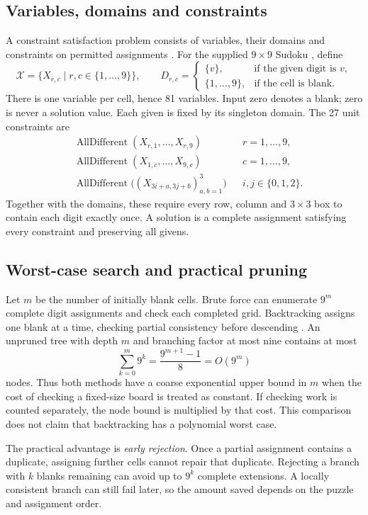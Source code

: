 \documentclass[11pt,a4paper]{article}
\begin{document}
\subsection{Variables, domains and constraints}
A constraint satisfaction problem consists of variables, their domains and constraints on permitted assignments \cite{csp}. For the supplied $9\times9$ Sudoku \cite{spec}, define
\[
\mathcal{X}=\{X_{r,c}\mid r,c\in\{1,\ldots,9\}\},\qquad
D_{r,c}=\begin{cases}\{v\},&\text{if the given digit is }v,\\
\{1,\ldots,9\},&\text{if the cell is blank.}\end{cases}
\]
There is one variable per cell, hence 81 variables. Input zero denotes a blank; zero is never a solution value. Each given is fixed by its singleton domain. The 27 unit constraints are
\begin{align*}
&\operatorname{AllDifferent}(X_{r,1},\ldots,X_{r,9}) &&r=1,\ldots,9,\\
&\operatorname{AllDifferent}(X_{1,c},\ldots,X_{9,c}) &&c=1,\ldots,9,\\
&\operatorname{AllDifferent}\bigl((X_{3i+a,3j+b})_{a,b=1}^{3}\bigr)
&&i,j\in\{0,1,2\}.
\end{align*}
Together with the domains, these require every row, column and $3\times3$ box to contain each digit exactly once. A solution is a complete assignment satisfying every constraint and preserving all givens.

\subsection{Worst-case search and practical pruning}
Let $m$ be the number of initially blank cells. Brute force can enumerate $9^m$ complete digit assignments and check each completed grid. Backtracking assigns one blank at a time, checking partial consistency before descending \cite{csp,backtracking}. An unpruned tree with depth $m$ and branching factor at most nine contains at most
\[
\sum_{k=0}^{m}9^k=\frac{9^{m+1}-1}{8}=O(9^m)
\]
nodes. Thus both methods have a coarse exponential upper bound in $m$ when the cost of checking a fixed-size board is treated as constant. If checking work is counted separately, the node bound is multiplied by that cost. This comparison does not claim that backtracking has a polynomial worst case.

The practical advantage is \emph{early rejection}. Once a partial assignment contains a duplicate, assigning further cells cannot repair that duplicate. Rejecting a branch with $k$ blanks remaining can avoid up to $9^k$ complete extensions. A locally consistent branch can still fail later, so the amount saved depends on the puzzle and assignment order.
\end{document}
